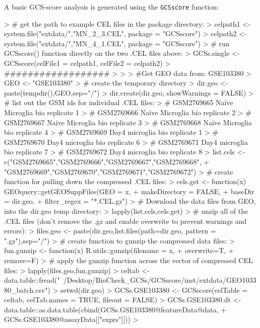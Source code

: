 \documentclass[12pt]{article}
\newcommand{\Rfunction}[1]{{\texttt{#1}}}
\begin{document}
A basic GCS-score analysis is generated using the \Rfunction{GCSscore} function:

\begin{Schunk}
\begin{Sinput}
> # get the path to example CEL files in the package directory:
> celpath1 <- system.file("extdata/","MN_2_3.CEL", package = "GCSscore")
> celpath2 <- system.file("extdata/","MN_4_1.CEL", package = "GCSscore")
> # run GCSscore() function directly on the two .CEL files above:
> GCSs.single <- GCSscore(celFile1 = celpath1, celFile2 = celpath2)
> ##################
> 
> 
> #Get GEO data from: GSE103380
> GEO <- "GSE103380"
> # create the temporary directory 
> dir.geo <- paste(tempdir(),GEO,sep="/")
> dir.create(dir.geo, showWarnings = FALSE)
> # list out the GSM ids for individual .CEL files:
> # GSM2769665	Naïve Microglia bio replicate 1
> # GSM2769666	Naïve Microglia bio replicate 2
> # GSM2769667	Naïve Microglia bio replicate 3
> # GSM2769668	Naïve Microglia bio replicate 4
> # GSM2769669	Day4 microglia bio replicate 1
> # GSM2769670	Day4 microglia bio replicate 6
> # GSM2769671	Day4 microglia bio replicate 7
> # GSM2769672	Day4 microglia bio replicate 8
> list.cels <- c("GSM2769665","GSM2769666","GSM2769667","GSM2769668",
+                "GSM2769669","GSM2769670","GSM2769671","GSM2769672")
> # create function for pulling down the compressed .CEL files:
> cels.get <- function(x)  GEOquery::getGEOSuppFiles(GEO = x,
+                                                    makeDirectory = FALSE,
+                                                    baseDir = dir.geo,
+                                                    filter_regex = "*.CEL.gz")
> # Download the data files from GEO, into the dir.geo temp directory:
> lapply(list.cels,cels.get)
> # unzip all of the .CEL files (don't remove the .gz and enable overwrite to prevent warnings and errors):
> files.geo <- paste(dir.geo,list.files(path=dir.geo, pattern = ".gz"),sep="/")
> # create function to gunzip the compressed data files:
> fun.gunzip <- function(x) R.utils::gunzip(filename = x,
+                                           overwrite=T,
+                                           remove=F)
> # apply the gunzip function across the vector of compressed CEL files:
> lapply(files.geo,fun.gunzip)
> celtab <- data.table::fread("~/Desktop/BioCheck_GCSs/GCSscore/inst/extdata/GEO103380_batch.csv")
> setwd(dir.geo)
> GCSs.GSE103380 <- GCSscore(celTable = celtab, celTab.names = TRUE, fileout = FALSE)
> GCSs.GSE103380.dt <- data.table::as.data.table(cbind(GCSs.GSE103380@featureData@data,
+                                                      GCSs.GSE103380@assayData[["exprs"]]))
> 
\end{Sinput}
\end{Schunk}
\end{document}
